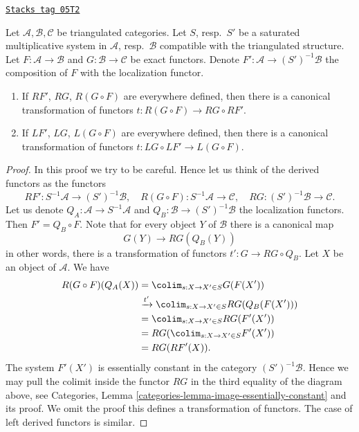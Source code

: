 \begin{lemma}
\label{derived-lemma-compose-derived-functors-general}
\href{https://stacks.math.columbia.edu/tag/05T2}{\texttt{Stacks tag 05T2}}

Let $\mathcal{A}, \mathcal{B}, \mathcal{C}$ be triangulated categories.
Let $S$, resp.\ $S'$ be a saturated multiplicative system in
$\mathcal{A}$, resp.\ $\mathcal{B}$ compatible with the triangulated structure.
Let $F : \mathcal{A} \to \mathcal{B}$ and $G : \mathcal{B} \to \mathcal{C}$
be exact functors. Denote $F' : \mathcal{A} \to (S')^{-1}\mathcal{B}$ the
composition of $F$ with the localization functor.
\begin{enumerate}
\item If $RF'$, $RG$, $R(G \circ F)$ are everywhere defined, then there
is a canonical transformation of functors
$t : R(G \circ F) \longrightarrow RG \circ RF'$.
\item If $LF'$, $LG$, $L(G \circ F)$ are everywhere defined, then there
is a canonical transformation of functors
$t : LG \circ LF' \to L(G \circ F)$.
\end{enumerate}
\end{lemma}

\begin{proof}
In this proof we try to be careful. Hence let us think of
the derived functors as the functors
$$
RF' : S^{-1}\mathcal{A} \to (S')^{-1}\mathcal{B}, \quad
R(G \circ F) : S^{-1}\mathcal{A} \to \mathcal{C}, \quad
RG : (S')^{-1}\mathcal{B} \to \mathcal{C}.
$$
Let us denote
$Q_A : \mathcal{A} \to S^{-1}\mathcal{A}$ and
$Q_B : \mathcal{B} \to (S')^{-1}\mathcal{B}$
the localization functors. Then $F' = Q_B \circ F$. Note that for
every object $Y$ of $\mathcal{B}$ there is a canonical map
$$
G(Y) \longrightarrow RG(Q_B(Y))
$$
in other words, there is a transformation of functors
$t' : G \to RG \circ Q_B$. Let $X$ be an object of $\mathcal{A}$.
We have
\begin{align*}
R(G \circ F)(Q_A(X))
& = \colim_{s : X \to X' \in S} G(F(X')) \\
& \xrightarrow{t'} \colim_{s : X \to X' \in S} RG(Q_B(F(X'))) \\
& = \colim_{s : X \to X' \in S} RG(F'(X')) \\
& = RG(\colim_{s : X \to X' \in S} F'(X')) \\
& = RG(RF'(X)).
\end{align*}
The system $F'(X')$ is essentially constant in the category
$(S')^{-1}\mathcal{B}$. Hence we may pull the colimit inside the
functor $RG$ in the third equality of the diagram above, see
Categories, Lemma \ref{categories-lemma-image-essentially-constant}
and its proof. We omit the proof this defines a transformation
of functors. The case of left derived functors is similar.
\end{proof}

